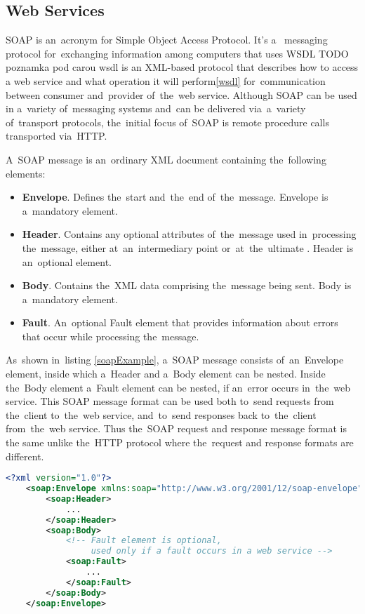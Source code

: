\subsection{ Web Services}
SOAP is an~acronym for Simple Object Access Protocol. It's a~
messaging protocol for~exchanging information among computers that uses WSDL
TODO poznamka pod carou wsdl is an XML-based protocol  that describes
how to access a web service and what operation it will perform\ref{wsdl}
for~communication between consumer and~provider of~the~web service.
Although SOAP can be used in a~variety of~messaging systems and~can be delivered
via~a~variety of~transport protocols, the~initial focus of~SOAP is remote procedure calls
transported via~HTTP.

A~SOAP message is an~ordinary XML document containing the~following elements:

\begin{itemize}
  \item \textbf{Envelope}. Defines the~start and~the~end of~the~message.
  Envelope is a~mandatory element.
  \item \textbf{Header}. Contains any optional attributes of~the~message used
  in~processing the~message, either at~an~intermediary point or~at~the~ultimate
  . Header is an~optional element.
  \item \textbf{Body}. Contains the~XML data comprising the~message being sent.
  Body is a~mandatory element.
  \item \textbf{Fault}. An~optional Fault element that provides information
  about errors that occur while processing the~message.
\end{itemize}

As~shown in~listing \ref{soapExample}, a~SOAP message consists of~an~Envelope
element, inside which a~Header and a~Body element can be nested. Inside the~Body
element a~Fault element can be nested, if an~error occurs in~the~web service.
This SOAP message format can be used both to~send requests from the~client
to~the~web service, and~to~send responses back to~the~client from~the~web
service. Thus the~SOAP request and response message format is the same unlike
the~HTTP protocol where the~request and response formats are different.

\begin{lstlisting}[caption=Example of~SOAP Message Structure., language=XML,
label=soapExample]
	<?xml version="1.0"?>
	<soap:Envelope xmlns:soap="http://www.w3.org/2001/12/soap-envelope">
		<soap:Header>
			...
		</soap:Header>
		<soap:Body>
			<!-- Fault element is optional,
				 used only if a fault occurs in a web service -->
			<soap:Fault>
				...
			</soap:Fault>
		</soap:Body>
	</soap:Envelope>		
\end{lstlisting}

